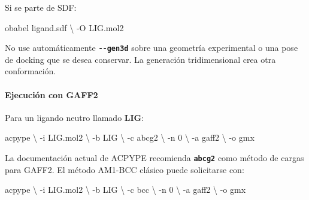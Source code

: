 \documentclass[
  spanish,
  11pt,
  a4paper]{article}
\newenvironment{Shaded}{\begin{snugshade}}{\end{snugshade}}
\newcommand{\AttributeTok}[1]{\textcolor[rgb]{0.13,0.29,0.53}{#1}}
\newcommand{\DataTypeTok}[1]{\textcolor[rgb]{0.13,0.29,0.53}{#1}}
\newcommand{\ExtensionTok}[1]{#1}
\newcommand{\NormalTok}[1]{#1}
\begin{document}
Si se parte de SDF:

\begin{Shaded}
\begin{Highlighting}[]
\ExtensionTok{obabel}\NormalTok{ ligand.sdf }\DataTypeTok{\textbackslash{}}
    \AttributeTok{{-}O}\NormalTok{ LIG.mol2}
\end{Highlighting}
\end{Shaded}

No use automáticamente \textbf{\texttt{-\/-gen3d}} sobre una geometría
experimental o una pose de docking que se desea conservar. La generación
tridimensional crea otra conformación.

\paragraph{Ejecución con GAFF2}\label{ejecuciuxf3n-con-gaff2}

Para un ligando neutro llamado \textbf{LIG}:

\begin{Shaded}
\begin{Highlighting}[]
\ExtensionTok{acpype} \DataTypeTok{\textbackslash{}}
    \AttributeTok{{-}i}\NormalTok{ LIG.mol2 }\DataTypeTok{\textbackslash{}}
    \AttributeTok{{-}b}\NormalTok{ LIG }\DataTypeTok{\textbackslash{}}
    \AttributeTok{{-}c}\NormalTok{ abcg2 }\DataTypeTok{\textbackslash{}}
    \AttributeTok{{-}n}\NormalTok{ 0 }\DataTypeTok{\textbackslash{}}
    \AttributeTok{{-}a}\NormalTok{ gaff2 }\DataTypeTok{\textbackslash{}}
    \AttributeTok{{-}o}\NormalTok{ gmx}
\end{Highlighting}
\end{Shaded}

La documentación actual de ACPYPE recomienda \textbf{\texttt{abcg2}}
como método de cargas para GAFF2. El método AM1-BCC clásico puede
solicitarse con:

\begin{Shaded}
\begin{Highlighting}[]
\ExtensionTok{acpype} \DataTypeTok{\textbackslash{}}
    \AttributeTok{{-}i}\NormalTok{ LIG.mol2 }\DataTypeTok{\textbackslash{}}
    \AttributeTok{{-}b}\NormalTok{ LIG }\DataTypeTok{\textbackslash{}}
    \AttributeTok{{-}c}\NormalTok{ bcc }\DataTypeTok{\textbackslash{}}
    \AttributeTok{{-}n}\NormalTok{ 0 }\DataTypeTok{\textbackslash{}}
    \AttributeTok{{-}a}\NormalTok{ gaff2 }\DataTypeTok{\textbackslash{}}
    \AttributeTok{{-}o}\NormalTok{ gmx}
\end{Highlighting}
\end{Shaded}
\end{document}
